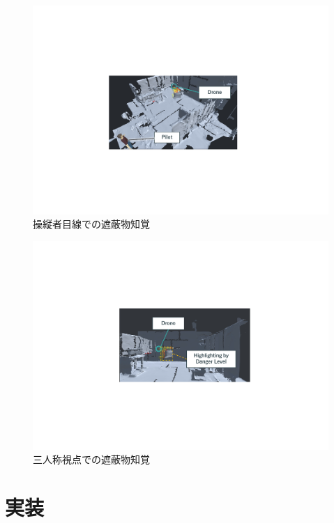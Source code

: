 \documentclass[a4paper,11pt]{ujreport}
\begin{document}
\begin{figure}[!tb]
  \centering
  \includegraphics[width=0.9\linewidth]{img/03_danger1.pdf}
  \caption{操縦者目線での遮蔽物知覚}
  \label{fig:03_dangerLevel1}
\end{figure}
\begin{figure}[!tb]
  \centering
  \includegraphics[width=0.9\linewidth]{img/03_danger2.pdf}
  \caption{三人称視点での遮蔽物知覚}
  \label{fig:03_dangerLevel2}
\end{figure}

\chapter{実装}
\label{chap:Development}

\end{document}
